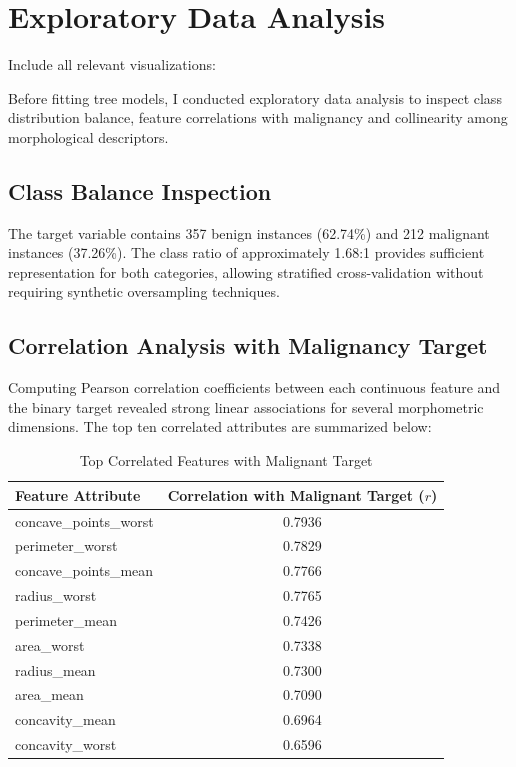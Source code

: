 \documentclass[12pt,a4paper]{article}
\begin{document}
\section{Exploratory Data Analysis}

Include all relevant visualizations:

Before fitting tree models, I conducted exploratory data analysis to inspect class distribution balance, feature correlations with malignancy and collinearity among morphological descriptors.

\subsection*{Class Balance Inspection}
The target variable contains 357 benign instances (62.74\%) and 212 malignant instances (37.26\%). The class ratio of approximately 1.68:1 provides sufficient representation for both categories, allowing stratified cross-validation without requiring synthetic oversampling techniques.

\subsection*{Correlation Analysis with Malignancy Target}
Computing Pearson correlation coefficients between each continuous feature and the binary target revealed strong linear associations for several morphometric dimensions. The top ten correlated attributes are summarized below:

\begin{table}[H]
\centering
\begin{tabular}{lc}
\toprule
\textbf{Feature Attribute} & \textbf{Correlation with Malignant Target ($r$)} \\
\midrule
concave\_points\_worst & 0.7936 \\
perimeter\_worst & 0.7829 \\
concave\_points\_mean & 0.7766 \\
radius\_worst & 0.7765 \\
perimeter\_mean & 0.7426 \\
area\_worst & 0.7338 \\
radius\_mean & 0.7300 \\
area\_mean & 0.7090 \\
concavity\_mean & 0.6964 \\
concavity\_worst & 0.6596 \\
\bottomrule
\end{tabular}
\caption{Top Correlated Features with Malignant Target}
\label{tab:exp5_top_corr}
\end{table}
\end{document}
